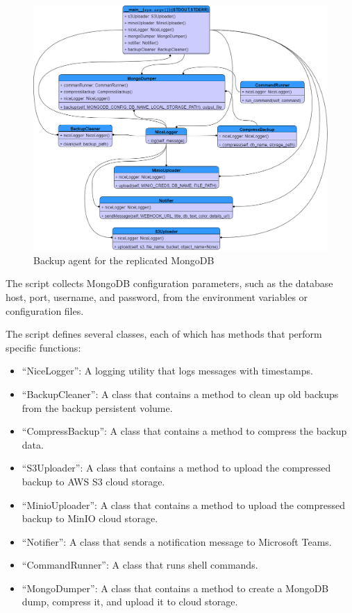  \begin{figure}[H]\centering
\includegraphics[width=1.0\textwidth,angle=00]{assets/f58.png}
\caption{Backup agent for the replicated MongoDB }
\label{fig:f58}
\end{figure}

The script collects MongoDB configuration parameters, such as the database host, port, username, and password, from the environment variables or configuration files. 

The script defines several classes, each of which has methods that perform specific functions: 

\begin{itemize}[label={--}]
\item “NiceLogger”: A logging utility that logs messages with timestamps. 
\item “BackupCleaner”: A class that contains a method to clean up old backups from the backup persistent volume. 
\item  “CompressBackup”: A class that contains a method to compress the backup  data. 
\item  “S3Uploader”: A class that contains a method to upload the compressed backup to AWS S3 cloud storage. 
\item “MinioUploader”: A class that contains a method to upload the compressed backup to MinIO cloud storage. 
\item  “Notifier”: A class that sends a notification message to Microsoft Teams. 
\item  “CommandRunner”: A class that runs shell commands. 
\item “MongoDumper”: A class that contains a method to create a MongoDB dump, compress it, and upload it to cloud storage. 
\end{itemize}
 

